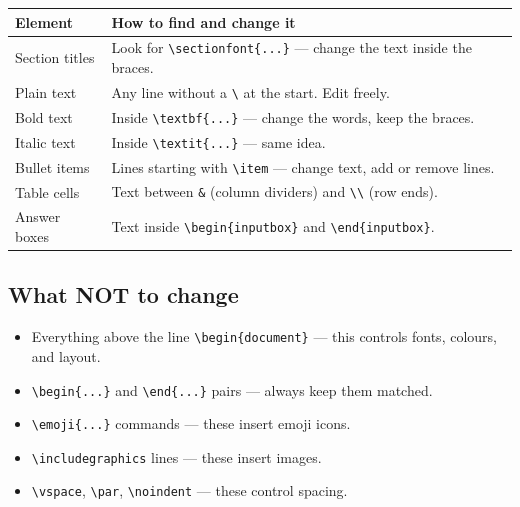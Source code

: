 \documentclass[a4paper,11pt]{article}
\begin{document}
\renewcommand{\arraystretch}{1.4}
\begin{center}
\begin{tabularx}{\textwidth}{l X}
\toprule
\textbf{Element} & \textbf{How to find and change it} \\
\midrule
Section titles & Look for \texttt{\textbackslash sectionfont\{...\}} --- change the text inside the braces. \\
Plain text & Any line without a \texttt{\textbackslash} at the start. Edit freely. \\
Bold text & Inside \texttt{\textbackslash textbf\{...\}} --- change the words, keep the braces. \\
Italic text & Inside \texttt{\textbackslash textit\{...\}} --- same idea. \\
Bullet items & Lines starting with \texttt{\textbackslash item} --- change text, add or remove lines. \\
Table cells & Text between \texttt{\&} (column dividers) and \texttt{\textbackslash\textbackslash} (row ends). \\
Answer boxes & Text inside \texttt{\textbackslash begin\{inputbox\}} and \texttt{\textbackslash end\{inputbox\}}. \\
\bottomrule
\end{tabularx}
\end{center}

\subsection{What NOT to change}

\begin{warnbox}
\begin{itemize}[itemsep=4pt]
  \item Everything above the line \texttt{\textbackslash begin\{document\}} --- this controls fonts, colours, and layout.
  \item \texttt{\textbackslash begin\{...\}} and \texttt{\textbackslash end\{...\}} pairs --- always keep them matched.
  \item \texttt{\textbackslash emoji\{...\}} commands --- these insert emoji icons.
  \item \texttt{\textbackslash includegraphics} lines --- these insert images.
  \item \texttt{\textbackslash vspace}, \texttt{\textbackslash par}, \texttt{\textbackslash noindent} --- these control spacing.
\end{itemize}
\end{warnbox}
\end{document}
